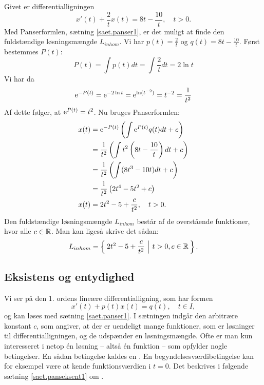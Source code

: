 \begin{example} \label{eks.pans11}
Givet er differentialligningen
\begin{equation} 
x'(t) + \frac{2}{t} x(t) = 8t - \frac{10}{t}, \quad t > 0.
\end{equation}
Med Panserformlen, sætning \ref{saet.panser1}, er det muligt at finde den fuldstændige løsningsmængde $ L_{inhom} $. Vi har $ p(t) = \frac{2}{t} $ og $ q(t) = 8t - \frac{10}{t} $. Først bestemmes $ P(t) $:
\begin{equation} 
P(t) = \int p(t) dt = \int \frac{2}{t} dt = 2 \ln t 
\end{equation}
Vi har da 
\begin{equation} 
\mathrm{e} ^{-P(t)} = \mathrm{e} ^{-2 \ln t} =  \mathrm{e} ^{\ln(t^{-2})} = t^{-2} = \frac{1}{t^2} 
\end{equation}
Af dette følger, at $ \mathrm{e} ^{P(t)} = t^2 $. Nu bruges Panserformlen:
\begin{equation}
\begin{aligned}
 x(t) &= \mathrm{e} ^{-P(t)} \left( \int \mathrm{e} ^{P(t)}q(t)dt + c \right) \\
      &= \frac{1}{t^2} \left( \int t^2 \left( 8t - \frac{10}{t} \right) dt + c \right) \\
      &= \frac{1}{t^2} \left( \int (8t^3 - 10t)dt + c \right) \\
      &= \frac{1}{t^2} \left( 2t^4 - 5t^2 + c \right) \\
 x(t) &= 2t^2 - 5 + \frac{c}{t^2}, \quad t>0.
\end{aligned}
\end{equation}
Den fuldstændige løsningsmængde $ L_{inhom} $ består af de overstående funktioner, hvor alle $ c \in \mathbb{R} $. Man kan ligeså skrive det sådan:
\begin{equation}
L_{inhom} = \left\lbrace \hspace*{-1mm} \begin{array}{c|c} 2t^2 - 5 + \dfrac{c}{t^2} & t>0, c \in \mathbb{R} \end{array} \hspace*{-1mm} \right\rbrace. 
\end{equation}
\end{example}

\subsection{Eksistens og entydighed} \label{subsek.eksent1}

Vi ser på den 1. ordens lineære differentialligning, som har formen
\begin{equation}
x'(t) + p(t)x(t) = q(t), \quad t \in I,
\end{equation}
og kan løses med sætning \ref{saet.panser1}. I sætningen indgår den arbitrære konstant $ c $, som angiver, at der er uendeligt mange funktioner, som er løsninger til differentialligningen, og de udspænder en løsningsmængde. Ofte er man kun interesseret i netop én løsning -- altså én funktion -- som opfylder nogle betingelser. En sådan betingelse kaldes en . En begyndelsesværdibetingelse kan for eksempel være at kende funktionsværdien i $ t=0 $. Det beskrives i følgende sætning \ref{saet.panseksent1} om . 

